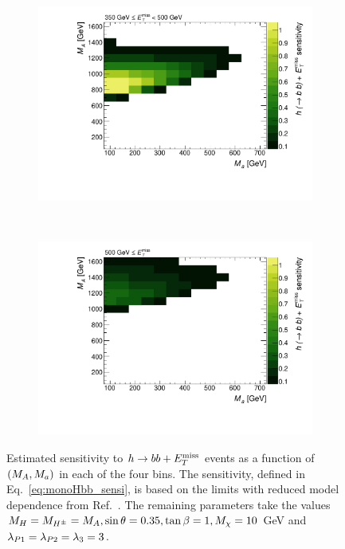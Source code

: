 \begin{figure}[tbp]
\begin{subfigure}{0.48\textwidth}
\includegraphics[width = \textwidth]{texinputs/04_grid/figures/monoHbb_sensi_bin_3_ma_vs_mA_lin.pdf}
\end{subfigure}
~
\begin{subfigure}{0.48\textwidth}
\includegraphics[width = \textwidth]{texinputs/04_grid/figures/monoHbb_sensi_bin_4_ma_vs_mA_lin.pdf}
\end{subfigure}
\caption[Sensitivity to the $h\rightarrow bb + \MET$ signal by $\MET$ bin, $\mA$ - $\ma$ plane]
{Estimated sensitivity to $h\rightarrow bb + \MET$ events as a function of $(M_{A},M_{a})$ in each of  the four \met bins. 
The sensitivity, defined in Eq.~\ref{eq:monoHbb_sensi}, is based on the limits with reduced model dependence from Ref.~\cite{Aaboud:2017yqz}. 
The remaining parameters take the values
$ M_{H}=M_{H^{\pm}}= M_{A}, \sin\theta = 0.35, \tan\beta = 1, M_{\chi} = 10$ GeV and $ \lambda_{P1} = \lambda_{P2} = \lambda_{3} = 3 $.}
\label{fig:monoHbb_sensi_bins_mA_ma}
\end{figure}

